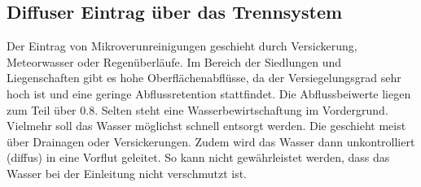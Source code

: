 \documentclass[9pt, openright=false]{scrartcl}
\begin{document}
\subsection{Diffuser Eintrag über das Trennsystem} 
Der Eintrag von Mikroverunreinigungen geschieht durch Versickerung, Meteorwasser oder Regenüberläufe. Im Bereich der Siedlungen und Liegenschaften gibt es hohe Oberflächenabflüsse, da der Versiegelungsgrad sehr hoch ist und eine geringe Abflussretention stattfindet. Die Abflussbeiwerte liegen zum Teil über 0.8. Selten steht eine Wasserbewirtschaftung im Vordergrund. Vielmehr soll das Wasser möglichst schnell entsorgt werden. Die geschieht meist über Drainagen oder Versickerungen. Zudem wird das Wasser dann unkontrolliert (diffus) in eine Vorflut geleitet. So kann nicht gewährleistet werden, dass das Wasser bei der Einleitung nicht verschmutzt ist.
\end{document}
